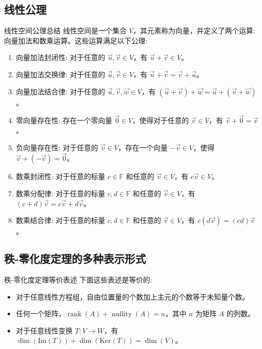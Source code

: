 \documentclass[a4paper,12pt]{ctexart}
\begin{document}
\subsection{线性公理}

\begin{myprop}{线性空间公理总结}{}
线性空间是一个集合 $V$，其元素称为向量，并定义了两个运算: 向量加法和数乘运算。这些运算满足以下公理:

\begin{enumerate}
    \item 向量加法封闭性: 对于任意的 $\vec{u}, \vec{v} \in V$，有 $\vec{u} + \vec{v} \in V$。
    \item 向量加法交换律: 对于任意的 $\vec{u}, \vec{v} \in V$，有 $\vec{u} + \vec{v} = \vec{v} + \vec{u}$。
    \item 向量加法结合律: 对于任意的 $\vec{u}, \vec{v}, \vec{w} \in V$，有 $(\vec{u} + \vec{v}) + \vec{w} = \vec{u} + (\vec{v} + \vec{w})$。
    \item 零向量存在性: 存在一个零向量 $\vec{0} \in V$，使得对于任意的 $\vec{v} \in V$，有 $\vec{v} + \vec{0} = \vec{v}$。
    \item 负向量存在性: 对于任意的 $\vec{v} \in V$，存在一个向量 $-\vec{v} \in V$，使得 $\vec{v} + (-\vec{v}) = \vec{0}$。
    \item 数乘封闭性: 对于任意的标量 $c \in \mathbb{F}$ 和任意的 $\vec{v} \in V$，有 $c \vec{v} \in V$。
    \item 数乘分配律: 对于任意的标量 $c, d \in \mathbb{F}$ 和任意的 $\vec{v} \in V$，有 $(c + d) \vec{v} = c \vec{v} + d \vec{v}$。
    \item 数乘结合律: 对于任意的标量 $c, d \in \mathbb{F}$ 和任意的 $\vec{v} \in V$，有 $c (d \vec{v}) = (cd) \vec{v}$。
\end{enumerate}
\end{myprop}

\newpage

\subsection{秩-零化度定理的多种表示形式}

\begin{mythm}{秩-零化度定理等价表述}{}
下面这些表述是等价的:
\begin{itemize}
    \item 对于任意线性方程组，自由位置量的个数加上主元的个数等于未知量个数。
    \item 任何一个矩阵，$\operatorname{rank}(A) + \operatorname{nullity}(A) = n$，其中 $n$ 为矩阵 $A$ 的列数。
    \item 对于任意线性变换 $T: V \to W$，有 $\dim(\text{Im}(T)) + \dim(\text{Ker}(T)) = \dim(V)$。
\end{itemize}
\end{mythm}
\end{document}
